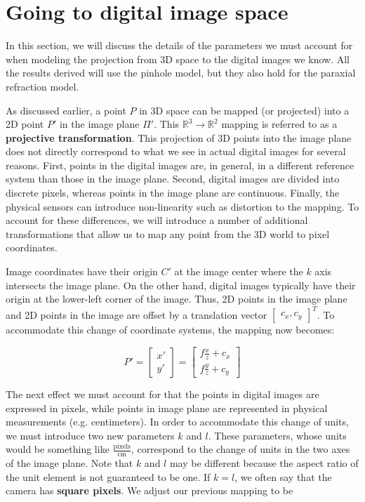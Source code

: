 \documentclass[a4paper, 12pt]{article}
\renewcommand\emph{\textbf}
\begin{document}
\section{Going to digital image space}
In this section, we will discuss the details of the parameters we must account for when modeling the projection from 3D space to the digital images we know. All the results derived will use the pinhole model, but they also hold for the paraxial refraction model.

As discussed earlier, a point $P$ in 3D space can be mapped (or projected) into a 2D point $P'$ in the image plane $\Pi'$. This $\mathbb{R}^3 \rightarrow \mathbb{R}^2$ mapping is referred to as a \emph{projective transformation}. This projection of 3D points into the image plane does not directly correspond to what we see in actual digital images for several reasons. First, points in the digital images are, in general, in a different reference system than those in the image plane. Second, digital images are divided into discrete pixels, whereas points in the image plane are continuous. Finally, the physical sensors can introduce non-linearity such as distortion to the mapping. To account for these differences, we will introduce a number of additional transformations that allow us to map any point from the 3D world to pixel coordinates.

Image coordinates have their origin $C'$ at the image center where the $k$ axis intersects the image plane. On the other hand, digital images typically have their origin at the lower-left corner of the image. Thus, 2D points in the image plane and 2D points in the image are offset by a translation vector $\begin{bmatrix}c_x, c_y\end{bmatrix}^T$. To accommodate this change of coordinate systems, the mapping now becomes:

\begin{equation}
    P' = \begin{bmatrix}x'\\y'\end{bmatrix} = \begin{bmatrix}f\frac{x}{z}+c_x \\ f\frac{y}{z}+c_y\end{bmatrix}
\end{equation}

The next effect we must account for that the points in digital images are expressed in pixels, while points in image plane are represented in physical measurements (e.g. centimeters). In order to accommodate this change of units, we must introduce two new parameters $k$ and $l$. These parameters, whose units would be something like $\frac{\mathrm{pixels}}{\mathrm{cm}}$, correspond to the change of units in the two axes of the image plane. Note that $k$ and $l$ may be different because the aspect ratio of the unit element is not guaranteed to be one. If $k=l$, we often say that the camera has \emph{square pixels}. We adjust our previous mapping to be
\end{document}
